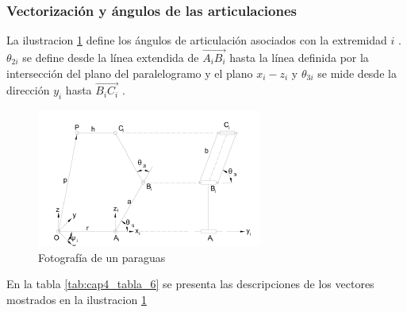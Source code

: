     \newpage

        \subsubsection{Vectorización y ángulos de las articulaciones} \label{cap4_angulosinteriores}
        
        La ilustracion \ref{f:Cap4_Metodo_A_Modelacion_Cinematica_Posicion_8} define los ángulos de articulación asociados con la extremidad  \( i \) .  \(  \theta _{2i} \)  se define desde la línea extendida de  \( \overrightarrow{A_{i}B_{i}} \)  hasta la línea definida por la intersección del plano del paralelogramo y el plano  \( x_{i}-z_{i} \)  y  \(  \theta _{3i} \)  se mide desde la dirección  \( y_{i} \)  hasta  \( \overrightarrow{B_{i}C_{i}} \) .
        
        \begin{figure}[htb]
             \centering
             \includegraphics[width=1.0\linewidth]{Main/Chapter4/Images4/Metodo_A_Modelacion_Cinematica_Posicion_8.png}
              \caption{Fotografía de un paraguas}
              \label{f:Cap4_Metodo_A_Modelacion_Cinematica_Posicion_8}
        \end{figure}
        
        
        En la tabla \ref{tab:cap4_tabla_6} se presenta las descripciones de los vectores mostrados en la ilustracion  \ref{f:Cap4_Metodo_A_Modelacion_Cinematica_Posicion_8}
        
